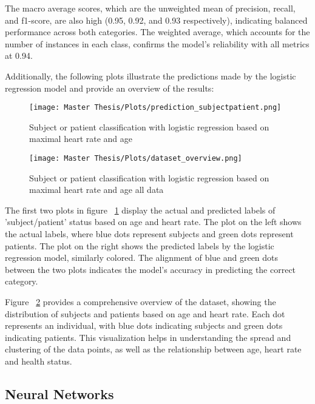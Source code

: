 The macro average scores, which are the unweighted mean of precision, recall, and f1-score, are also high (0.95, 0.92, and 0.93 respectively), indicating balanced performance across both categories. The weighted average, which accounts for the number of instances in each class, confirms the model's reliability with all metrics at 0.94.

Additionally, the following plots illustrate the predictions made by the logistic regression model and provide an overview of the results:

\FloatBarrier
\begin{figure}[h!]
\centering
\texttt{[image: Master Thesis/Plots/prediction\_subjectpatient.png]}
\caption{Subject or patient classification with logistic regression based on maximal heart rate and age}
\label{figure:logregwithheartrateage}
\end{figure}
\FloatBarrier

\FloatBarrier
\begin{figure}[h!]
\centering
\texttt{[image: Master Thesis/Plots/dataset\_overview.png]}
\caption{Subject or patient classification with logistic regression based on maximal heart rate and age all data}
\label{figure:logregwithheartrateageall}
\end{figure}
\FloatBarrier

The first two plots in figure ~\ref{figure:logregwithheartrateage} display the actual and predicted labels of 'subject/patient' status based on age and heart rate. The plot on the left shows the actual labels, where blue dots represent subjects and green dots represent patients. The plot on the right shows the predicted labels by the logistic regression model, similarly colored. The alignment of blue and green dots between the two plots indicates the model's accuracy in predicting the correct category.

Figure ~\ref{figure:logregwithheartrateageall} provides a comprehensive overview of the dataset, showing the distribution of subjects and patients based on age and heart rate. Each dot represents an individual, with blue dots indicating subjects and green dots indicating patients. This visualization helps in understanding the spread and clustering of the data points, as well as the relationship between age, heart rate and health status.

\subsection{Neural Networks}

